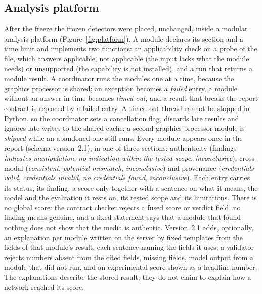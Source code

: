 \documentclass[conference,a4paper]{IEEEtran_nodash}
\begin{document}
\subsection{Analysis platform}\label{sec:platform}
After the freeze the frozen detectors were placed, unchanged, inside a modular
analysis platform (Figure~\ref{fig:platform}). A module declares its section and a
time limit and implements two functions: an applicability check on a probe of
the file, which answers applicable, not applicable (the input lacks what the
module needs) or unsupported (the capability is not installed), and a run that
returns a module result. A coordinator runs the modules one at a time, because
the graphics processor is shared; an exception becomes a \emph{failed} entry, a
module without an answer in time becomes \emph{timed out}, and a result that
breaks the report contract is replaced by a failed entry. A timed-out thread
cannot be stopped in Python, so the coordinator sets a cancellation flag,
discards late results and ignores late writes to the shared cache; a second
graphics-processor module is \emph{skipped} while an abandoned one still runs.
Every module appears once in the report (schema version~2.1), in one of three
sections: authenticity (findings \emph{indicates manipulation}, \emph{no
indication within the tested scope}, \emph{inconclusive}), cross-modal
(\emph{consistent}, \emph{potential mismatch}, \emph{inconclusive}) and
provenance (\emph{credentials valid}, \emph{credentials invalid}, \emph{no
credentials found}, \emph{inconclusive}). Each entry carries its status, its
finding, a score only together with a sentence on what it means, the model and
the evaluation it rests on, its tested scope and its limitations. There is no
global score: the contract checker rejects a fused score or verdict field, no
finding means genuine, and a fixed statement says that a module that found
nothing does not show that the media is authentic. Version~2.1 adds, optionally,
an explanation per module written on the server by fixed templates from the
fields of that module's result, each sentence naming the fields it uses; a
validator rejects numbers absent from the cited fields, missing fields, model
output from a module that did not run, and an experimental score shown as a
headline number. The explanations describe the stored result; they do not
claim to explain how a network reached its score. %
\end{document}
